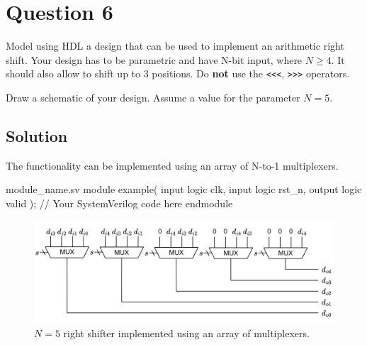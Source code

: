 \documentclass[../main.tex]{subfiles}
\begin{document}
\section{Question 6}

Model using HDL a design that can be used to implement an arithmetic right shift. Your design has to be parametric and have N-bit input, where $N \geq 4$. It should also allow to shift up to 3 positions. Do \textbf{not} use the \texttt{<<<}, \texttt{>>>} operators.

Draw a schematic of your design. Assume a value for the parameter $N = 5$.

\subsection*{Solution}

The functionality can be implemented using an array of N-to-1 multiplexers.

\begin{svminted}{module\_name.sv}
module example(
    input  logic clk,
    input  logic rst_n,
    output logic valid
);
    // Your SystemVerilog code here
endmodule
\end{svminted}

\begin{figure}[h]
    \centering
    \includegraphics[width=1.0\linewidth]{assets/q6.png}
    \caption{$N = 5$ right shifter implemented using an array of multiplexers.}
    \label{q6}
\end{figure}
\end{document}
